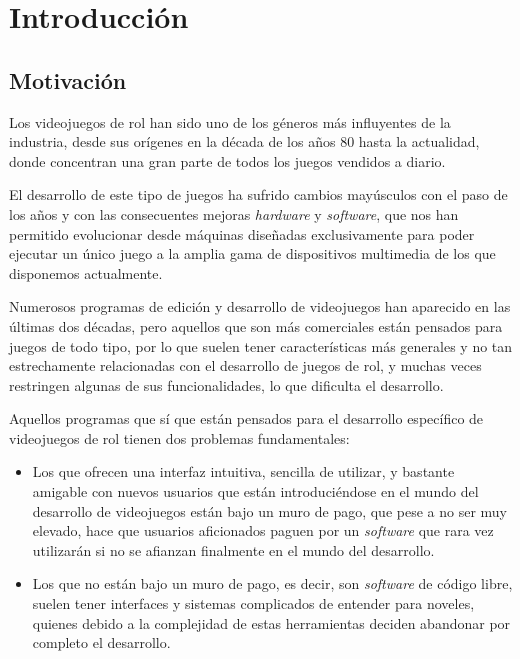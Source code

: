 \chapter{Introducción}
\label{cap:introduccion}


\section{Motivación}
Los videojuegos de rol han sido uno de los géneros más influyentes de la industria, desde sus orígenes en la década de los años 80 hasta la actualidad, donde concentran una gran parte de todos los juegos vendidos a diario.

\smallskip

El desarrollo de este tipo de juegos ha sufrido cambios mayúsculos con el paso de los años y con las consecuentes mejoras \textit{hardware} y \textit{software}, que nos han permitido evolucionar desde máquinas diseñadas exclusivamente para poder ejecutar un único juego a la amplia gama de dispositivos multimedia de los que disponemos actualmente.

\medskip

Numerosos programas de edición y desarrollo de videojuegos han aparecido en las últimas dos décadas, pero aquellos que son más comerciales están pensados para juegos de todo tipo, por lo que suelen tener características más generales y no tan estrechamente relacionadas con el desarrollo de juegos de rol, y muchas veces restringen algunas de sus funcionalidades, lo que dificulta el desarrollo.

\smallskip

Aquellos programas que sí que están pensados para el desarrollo específico de videojuegos de rol tienen dos problemas fundamentales:
\begin{itemize}
	\item Los que ofrecen una interfaz intuitiva, sencilla de utilizar, y bastante amigable con nuevos usuarios que están introduciéndose en el mundo del desarrollo de videojuegos están bajo un muro de pago, que pese a no ser muy elevado, hace que usuarios aficionados paguen por un \textit{software} que rara vez utilizarán si no se afianzan finalmente en el mundo del desarrollo.
	\item Los que no están bajo un muro de pago, es decir, son \textit{software} de código libre, suelen tener interfaces y sistemas complicados de entender para noveles, quienes debido a la complejidad de estas herramientas deciden abandonar por completo el desarrollo.
\end{itemize}

